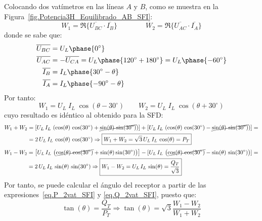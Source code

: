 	Colocando dos vatímetros en las líneas $A$ y $B$, como se muestra en la Figura~\ref{fig.Potencia3H_Equilibrado_AB_SFI}:
	\begin{equation*}
	    W_1=\Re\{\overline{U_{BC}} \cdot \overline{I_B}\}\qquad\qquad W_2=\Re\{\overline{U_{AC}} \cdot \overline{I_A}\}
	\end{equation*}
	donde se sabe que:
	\begin{align*}
	    \overline{U_{BC}}&=U_L\phase{0^\circ}\\
	   \overline{U_{AC}}&=-\overline{U_{CA}}=U_L\phase{120^\circ+180^\circ}=U_L\phase{-60^\circ}\\ \overline{I_B}&=I_L\phase{30^\circ-\theta} \\  \overline{I_A}&=I_L\phase{-90^\circ-\theta}
	\end{align*}
	Por tanto: 
	\begin{equation*}
	    W_1=U_L\;I_L\;\cos{(\theta-30^\circ)}\qquad W_2={U_L}\; {I_L}\;\cos{(\theta+30^\circ)}
	\end{equation*}
	cuyo resultado es idéntico al obtenido para la SFD: 
\begin{align}\label{eq.P_2vat_SFI}
    W_1+W_2&=\left[ U_L\,I_L\,\left( \cos(\theta)\,\cos({30^\circ}) + \cancel{\sin(\theta)\,\sin({30^\circ})}\right) \right] + [U_L\,I_L\,\left( \cos(\theta)\,\cos({30^\circ}) - \cancel{\sin(\theta)\,\sin({30^\circ})}\right) ]=\nonumber\\
    &=2\,U_L\,I_L\,\cos(\theta)\,\cos({30^\circ}) \Rightarrow \boxed{W_1 + W_2 = \sqrt{3}\,U_L\, I_L\,\cos(\theta) = P_T}
\end{align}
\begin{align}\label{eq.Q_2vat_SFI}
    W_1-W_2&=\left[U_L\,I_L\,\left( \cancel{\cos(\theta)\,\cos({30^\circ})} + \sin(\theta)\sin({30^\circ})\right)\right] - [U_L\,I_L\,\left( \cancel{\cos(\theta)\,\cos({30^\circ})} - \sin(\theta)\,\sin({30^\circ})\right) ]=\nonumber\\
    &=2\,U_L\,I_L\,\sin(\theta)\,\sin({30^\circ}) \Rightarrow \boxed{W_1 - W_2 = U_L\, I_L\,\sin(\theta) = \frac{Q_T}{\sqrt{3}}}
\end{align}
Por tanto, se puede calcular el ángulo del receptor a partir de las expresiones~\eqref{eq.P_2vat_SFI} y \eqref{eq.Q_2vat_SFI}, puesto que:
\begin{equation}
    \tan(\theta) = \dfrac{Q_T}{P_T}\Rightarrow \boxed{\tan(\theta) = \sqrt{3} \frac{W_1 - W_2}{W_1 + W_2}}
\end{equation}

